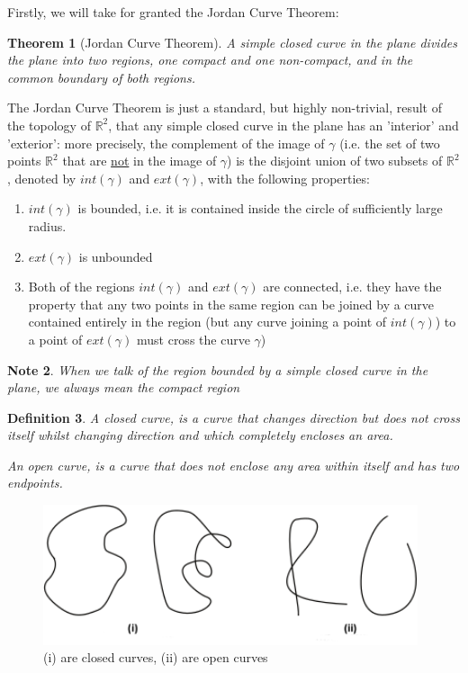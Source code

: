 \documentclass[a4paper]{book}
\newtheorem{theorem}{Theorem}%
\newtheorem{note}[theorem]{Note}%
\newtheorem{definition}[theorem]{Definition}%
\numberwithin{theorem}{section}%
\begin{document}
Firstly, we will take for granted the Jordan Curve Theorem:
\begin{theorem}[Jordan Curve Theorem]
    A simple closed curve in the plane divides the plane into two regions, one compact and one non-compact, and in the common boundary of both regions.
\end{theorem} 

The Jordan Curve Theorem is just a standard, but highly non-trivial, result of the topology of $\mathbb{R}^2$, that any simple closed curve in the plane has an 'interior' and 'exterior': more precisely, the complement of the image of $\gamma$ (i.e. the set of two points $\mathbb{R}^2$ that are \underline{not} in the image of $\gamma$) is the disjoint union of two subsets of $\mathbb{R}^2$, denoted by $int(\gamma)$ and $ext(\gamma)$, with the following properties:
\begin{enumerate}
    \item $int(\gamma)$ is bounded, i.e. it is contained inside the circle of sufficiently large radius.
    \item $ext(\gamma)$ is unbounded
    \item Both of the regions $int(\gamma)$ and $ext(\gamma)$ are connected, i.e. they have the property that any two points in the same region can be joined by a curve contained entirely in the region (but any curve joining a point of $int(\gamma)$) to a point of $ext(\gamma)$ must cross the curve $\gamma$)
\end{enumerate}


\begin{note} 
    When we talk of the region bounded by a simple closed curve in the plane, we always mean the compact region
\end{note}

\begin{definition}
    A closed curve, is a curve that changes direction but does not cross itself whilst changing direction and which completely encloses an \textit{area}. 

    An open curve, is a curve that does not enclose any area within itself and has two endpoints.
\end{definition}
\begin{figure}[hbt!]
    \begin{center}   
        \includegraphics[width=110mm]{ClosedCurve}
        \caption{(i) are closed curves, (ii) are open curves}
    \end{center}
\end{figure}\leavevmode
\end{document}
